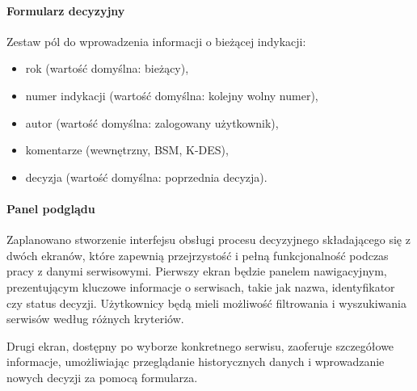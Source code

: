 \paragraph{Formularz decyzyjny}
Zestaw pól do wprowadzenia informacji o bieżącej indykacji:
\begin{itemize}
    \item rok (wartość domyślna: bieżący),
    \item numer indykacji (wartość domyślna: kolejny wolny numer),
    \item autor (wartość domyślna: zalogowany użytkownik),
    \item komentarze (wewnętrzny, BSM, K-DES),
    \item decyzja (wartość domyślna: poprzednia decyzja).
\end{itemize}

\paragraph{Panel podglądu}

Zaplanowano stworzenie interfejsu obsługi procesu decyzyjnego składającego się z dwóch ekranów, które zapewnią przejrzystość i pełną funkcjonalność podczas pracy z danymi serwisowymi. Pierwszy ekran będzie panelem nawigacyjnym, prezentującym kluczowe informacje o serwisach, takie jak nazwa, identyfikator czy status decyzji. Użytkownicy będą mieli możliwość filtrowania i wyszukiwania serwisów według różnych kryteriów.

Drugi ekran, dostępny po wyborze konkretnego serwisu, zaoferuje szczegółowe informacje, umożliwiając przeglądanie historycznych danych i wprowadzanie nowych decyzji za pomocą formularza.
